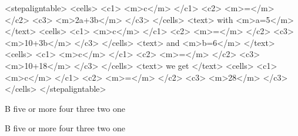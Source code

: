 \typebuffer \processxmlbuffer

\startbuffer
<stepaligntable>
  <cells>
    <c1> <m>c</m> </c1> <c2> <m>=</m> </c2> <c3> <m>2a+3b</m> </c3>
  </cells>
  <text>
    with <m>a=5</m>
  </text>
  <cells>
    <c1> <m>c</m> </c1> <c2> <m>=</m> </c2> <c3> <m>10+3b</m> </c3>
  </cells>
  <text>
    and <m>b=6</m>
  </text>
  <cells>
    <c1> <m>c</m> </c1> <c2> <m>=</m> </c2> <c3> <m>10+18</m> </c3>
  </cells>
  <text>
    we get
  </text>
  <cells>
    <c1> <m>c</m> </c1> <c2> <m>=</m> </c2> <c3> <m>28</m> </c3>
  </cells>
</stepaligntable>
\stopbuffer

\typebuffer \processxmlbuffer

\stopsection

\startsection[title=\TEX\ example]

\startbuffer
\startSTEPchart
{}            {B}
          {five or more} 
          {four}         
        {three}        
         {two}          
 {one}
\stopSTEPchart
\stopbuffer

\typebuffer \getbuffer

\startbuffer
\startSTEPchart
{}
          
          
        
         
\stopSTEPchart
\stopbuffer

\typebuffer \getbuffer

\startbuffer
\startSTEPchart
{}            {B}
          {five or more} 
          {four}         
        {three}        
         {two}          
 {one}
\stopSTEPchart
\stopbuffer

\typebuffer \getbuffer

\startbuffer
\startSTEPchart
{}
      
\stopSTEPchart
\stopbuffer

\typebuffer \getbuffer

\startbuffer
\startSTEPchart
{}
    
  
\stopSTEPchart
\stopbuffer

\typebuffer \getbuffer

